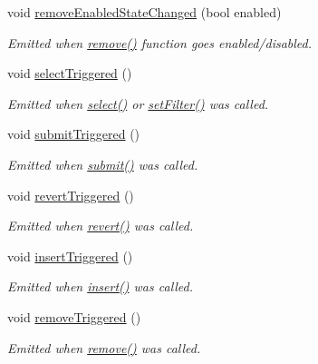 \begin{DoxyCompactItemize}
void \hyperlink{classmdt_abstract_sql_table_controller_adcac9058c974b76574fc5aaed3512c8c}{remove\-Enabled\-State\-Changed} (bool enabled)
\begin{DoxyCompactList}\small\item\em Emitted when \hyperlink{classmdt_abstract_sql_table_controller_a7bbe0f951403acbcc01c99f5916b9204}{remove()} function goes enabled/disabled. \end{DoxyCompactList}\item 
void \hyperlink{classmdt_abstract_sql_table_controller_a4254d5b68587417f53384381f44c29ff}{select\-Triggered} ()
\begin{DoxyCompactList}\small\item\em Emitted when \hyperlink{classmdt_abstract_sql_table_controller_ae26ede862ac54ece9243b264ea22cefb}{select()} or \hyperlink{classmdt_abstract_sql_table_controller_a28b24065dc465fdc0944464708adf63f}{set\-Filter()} was called. \end{DoxyCompactList}\item 
void \hyperlink{classmdt_abstract_sql_table_controller_a07bebc4d4fec28edf3468920fa0cf285}{submit\-Triggered} ()
\begin{DoxyCompactList}\small\item\em Emitted when \hyperlink{classmdt_abstract_sql_table_controller_a14f3e2a91fc30ca0e018944f4f95bc33}{submit()} was called. \end{DoxyCompactList}\item 
void \hyperlink{classmdt_abstract_sql_table_controller_a34238105f2b767e684f309c8af961572}{revert\-Triggered} ()
\begin{DoxyCompactList}\small\item\em Emitted when \hyperlink{classmdt_abstract_sql_table_controller_a36af2665b6d742aba3bc7f6ee6b2a6c4}{revert()} was called. \end{DoxyCompactList}\item 
void \hyperlink{classmdt_abstract_sql_table_controller_a277d087a34874bc6ac42f2e02e9f57d3}{insert\-Triggered} ()
\begin{DoxyCompactList}\small\item\em Emitted when \hyperlink{classmdt_abstract_sql_table_controller_a82e88e4ff610f73b629bb6d2f229d1aa}{insert()} was called. \end{DoxyCompactList}\item 
void \hyperlink{classmdt_abstract_sql_table_controller_ae76bdc25407f8ed1411919edf5f77b18}{remove\-Triggered} ()
\begin{DoxyCompactList}\small\item\em Emitted when \hyperlink{classmdt_abstract_sql_table_controller_a7bbe0f951403acbcc01c99f5916b9204}{remove()} was called. \end{DoxyCompactList}\item 

\end{DoxyCompactItemize}

